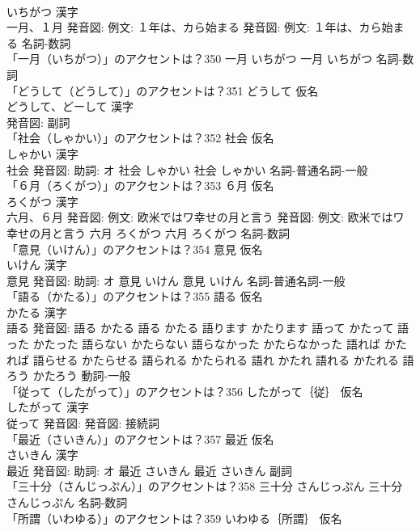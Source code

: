 \documentclass[8pt]{extreport}
\begin{document}
\begin{CJK}{UTF8}{min}
\\	いちがつ 漢字　
\\	一月、１月 発音図: 例文: １年は、カら始まる 発音図: 例文: １年は、カら始まる							名詞-数詞 
\\	「一月（いちがつ）」のアクセントは？350		一月 いちがつ		一月 いちがつ				名詞-数詞 
\\	「どうして（どうして）」のアクセントは？351	どうして 仮名　
\\	どうして、どーして 漢字　
\\	発音図:							副詞 
\\	「社会（しゃかい）」のアクセントは？352	社会 仮名　
\\	しゃかい 漢字　
\\	社会 発音図: 助詞: オ	社会 しゃかい		社会 しゃかい				名詞-普通名詞-一般 
\\	「６月（ろくがつ）」のアクセントは？353	６月 仮名　
\\	ろくがつ 漢字　
\\	六月、６月 発音図: 例文: 欧米ではワ幸せの月と言う 発音図: 例文: 欧米ではワ幸せの月と言う	六月 ろくがつ		六月 ろくがつ				名詞-数詞 
\\	「意見（いけん）」のアクセントは？354	意見 仮名　
\\	いけん 漢字　
\\	意見 発音図: 助詞: オ	意見 いけん		意見 いけん				名詞-普通名詞-一般 
\\	「語る（かたる）」のアクセントは？355	語る 仮名　
\\	かたる 漢字　
\\	語る 発音図:	語る かたる		語る かたる 語ります かたります 語って かたって 語った かたった 語らない かたらない 語らなかった かたらなかった 語れば かたれば 語らせる かたらせる 語られる かたられる 語れ かたれ 語れる かたれる 語ろう かたろう				動詞-一般 
\\	「従って（したがって）」のアクセントは？356	したがって｛従｝ 仮名　
\\	したがって 漢字　
\\	従って 発音図: 発音図:							接続詞 
\\	「最近（さいきん）」のアクセントは？357	最近 仮名　
\\	さいきん 漢字　
\\	最近 発音図: 助詞: オ	最近 さいきん		最近 さいきん				副詞 
\\	「三十分（さんじっぷん）」のアクセントは？358		三十分 さんじっぷん		三十分 さんじっぷん				名詞-数詞 
\\	「所謂（いわゆる）」のアクセントは？359	いわゆる｛所謂｝ 仮名　

\end{CJK}
\end{document}

